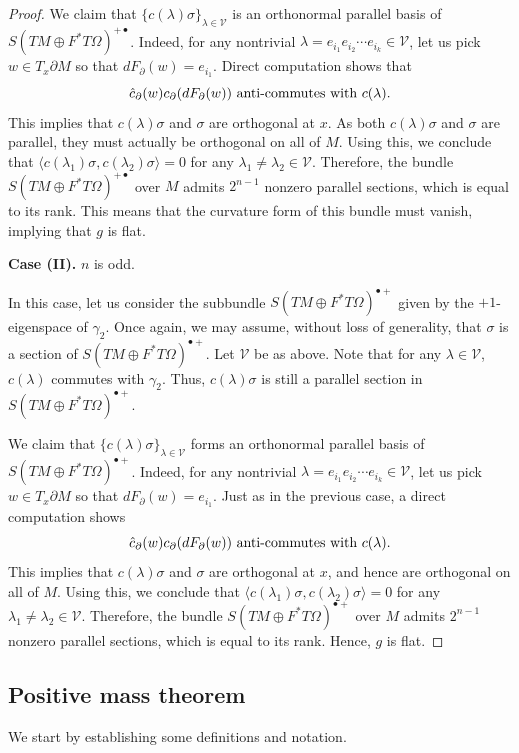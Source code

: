 \documentclass[12pt, reqno]{amsart}
\theoremstyle{plain} %
\theoremstyle{definition}
\theoremstyle{remark}
\numberwithin{equation}{section}
\begin{document}
\begin{proof}
    We claim that $\{c(\lambda)\sigma\}_{\lambda\in\mathscr V}$ is an orthonormal parallel basis of $S(TM\oplus F^*T\Omega)^{+\bullet}$.
    Indeed, for any nontrivial $\lambda=e_{i_1}e_{i_2}\cdots e_{i_k}\in\mathscr V$, let us pick $w\in T_x\partial M$ so that $dF_\partial(w)=e_{i_1}$.
    Direct computation shows that
    $$\hat c_\partial(w) c_\partial(dF_\partial (w))\textup{ anti-commutes with } c(\lambda).$$
    This implies that \(c(\lambda) \sigma\) and \(\sigma\) are orthogonal at \(x\). As both \(c(\lambda)\sigma\) and \(\sigma\) are parallel, they must actually be orthogonal on all of \(M\). 
    Using this, we conclude that $\langle c(\lambda_1)\sigma,c(\lambda_2)\sigma\rangle=0$ for any $\lambda_1\ne\lambda_2\in\mathscr V$.
    Therefore, the bundle \(S(TM\oplus F^*T\Omega)^{+\bullet}\) over \(M\) admits \(2^{n-1}\) nonzero parallel sections, which is equal to its rank.
    This means that the curvature form of this bundle must vanish, implying that \(g\) is flat. 

    \textbf{Case (II).} $n$ is odd.

    In this case, let us consider the subbundle $S(TM\oplus F^*T\Omega)^{\bullet+}$ given by the $+1$-eigenspace of $\gamma_2$. Once again, we may assume, without loss of generality, that $\sigma$ is a section of $S(TM\oplus F^*T\Omega)^{\bullet+}$. Let $\mathscr V$ be as above.
    Note that for any $\lambda\in\mathscr V$, $c(\lambda)$ commutes with $\gamma_2$. Thus, $c(\lambda)\sigma$ is still a parallel section in $S(TM\oplus F^*T\Omega)^{\bullet+}$.
    
    We claim that $\{c(\lambda)\sigma\}_{\lambda\in\mathscr V}$ forms an orthonormal parallel basis of $S(TM\oplus F^*T\Omega)^{\bullet+}$.
    Indeed, for any nontrivial $\lambda=e_{i_1}e_{i_2}\cdots e_{i_k}\in\mathscr V$, let us pick $w\in T_x\partial M$ so that $dF_\partial(w)=e_{i_1}$. Just as in the previous case, a direct computation shows
    $$\hat c_\partial(w) c_\partial(dF_\partial (w))\textup{ anti-commutes with } c(\lambda).$$
    This implies that \(c(\lambda) \sigma\) and \(\sigma\) are orthogonal at \(x\), and hence are orthogonal on all of \(M\).
    Using this, we conclude that $\langle c(\lambda_1)\sigma,c(\lambda_2)\sigma\rangle=0$ for any $\lambda_1\ne\lambda_2\in\mathscr V$.    
    Therefore, the bundle \(S(TM\oplus F^*T\Omega)^{\bullet+}\) over \(M\) admits \(2^{n-1}\) nonzero parallel sections, which is equal to its rank. Hence, \(g\) is flat. 
\end{proof}

\subsection{Positive mass theorem}
We start by establishing some definitions and notation.
\end{document}

